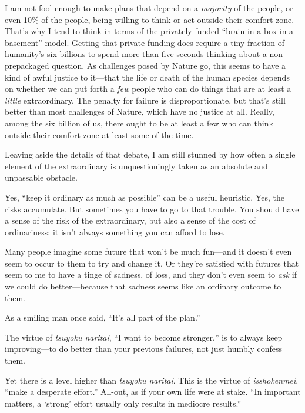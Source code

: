 {
 I am not fool enough to make plans that depend on a
\textit{majority} of the people, or even 10\% of the people, being
willing to think or act outside their comfort zone.
That's why I tend to think in terms of the privately
funded ``brain in a box in a
basement'' model. Getting that private funding does
require a tiny fraction of humanity's six billions to
spend more than five seconds thinking about a non-prepackaged question.
As challenges posed by Nature go, this seems to have a kind of awful
justice to it---that the life or death of the human species depends on
whether we can put forth a \textit{few} people who can do things that
are at least a \textit{little} extraordinary. The penalty for failure
is disproportionate, but that's still better than most
challenges of Nature, which have no justice at all. Really, among the
six billion of us, there ought to be at least a few who can think
outside their comfort zone at least some of the time.}

{
 Leaving aside the details of that debate, I am still stunned by
how often a single element of the extraordinary is unquestioningly
taken as an absolute and unpassable obstacle.}

{
 Yes, ``keep it ordinary as much as
possible'' can be a useful heuristic. Yes, the risks
accumulate. But sometimes you have to go to that trouble. You should
have a sense of the risk of the extraordinary, but also a sense of the
cost of ordinariness: it isn't always something you can
afford to lose.}

{
 Many people imagine some future that won't be much
fun---and it doesn't even seem to occur to them to try
and change it. Or they're satisfied with futures that
seem to me to have a tinge of sadness, of loss, and they
don't even seem to \textit{ask} if we could do
better---because that sadness seems like an ordinary outcome to them.}

{
 As a smiling man once said,
``It's all part of the
plan.''}

\myendsectiontext


\bigskip


{
 The virtue of \textit{tsuyoku naritai}, ``I want
to become stronger,'' is to always keep
improving---to do better than your previous failures, not just humbly
confess them. }

{
 Yet there is a level higher than \textit{tsuyoku naritai}. This is
the virtue of \textit{isshokenmei}, ``make a desperate
effort.'' All-out, as if your own life were at stake.
``In important matters, a
`strong' effort usually only results in
mediocre results.''}


